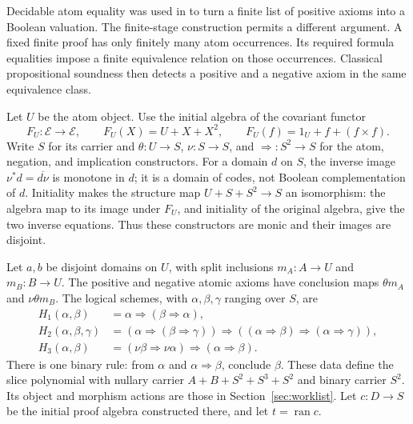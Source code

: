 \documentclass[11pt]{article}
\theoremstyle{definition}\newtheorem{definition}[theorem]{Definition}
\theoremstyle{remark}\newtheorem{remark}[theorem]{Remark}
\newcommand{\E}{\mathscr E}
\newcommand{\ran}{\operatorname{ran}}
\begin{document}
Decidable atom equality was used in \cite[Theorem~6.2]{FiniteProofs}
to turn a finite list of positive axioms into a Boolean valuation.
The finite-stage construction permits a different argument. A fixed
finite proof has only finitely many atom occurrences. Its required
formula equalities impose a finite equivalence relation on those
occurrences. Classical propositional soundness then detects a
positive and a negative axiom in the same equivalence class.

Let \(U\) be the atom object. Use the initial algebra of the covariant
functor
\[
 F_U:\E\to\E,\qquad F_U(X)=U+X+X^2,\qquad
 F_U(f)=1_U+f+(f\times f).
\]
Write \(S\) for its carrier and
\(\theta:U\to S\), \(\nu:S\to S\), and
\({\Rightarrow}:S^2\to S\) for the atom, negation, and implication
constructors. For a domain \(d\) on \(S\), the inverse image
\(\nu^*d=\overline{d\nu}\) is monotone in \(d\); it is a
domain of codes, not Boolean complementation of \(d\).
Initiality makes the structure map \(U+S+S^2\to S\)
an isomorphism: the algebra map to its image under \(F_U\), and
initiality of the original algebra, give the two inverse equations.
Thus these constructors are monic and their images are disjoint.

Let \(a,b\) be disjoint domains on \(U\), with split inclusions
\(m_A:A\to U\) and \(m_B:B\to U\). The positive and negative atomic
axioms have conclusion maps \(\theta m_A\) and \(\nu\theta m_B\).
The logical schemes, with \(\alpha,\beta,\gamma\) ranging over \(S\),
are
\begin{align*}
 H_1(\alpha,\beta)&=\alpha\Rightarrow(\beta\Rightarrow\alpha),\\
 H_2(\alpha,\beta,\gamma)&=
  (\alpha\Rightarrow(\beta\Rightarrow\gamma))
  \Rightarrow((\alpha\Rightarrow\beta)
                 \Rightarrow(\alpha\Rightarrow\gamma)),\\
 H_3(\alpha,\beta)&=
  (\nu\beta\Rightarrow\nu\alpha)
                 \Rightarrow(\alpha\Rightarrow\beta).
\end{align*}
There is one binary rule: from \(\alpha\) and
\(\alpha\Rightarrow\beta\), conclude \(\beta\).
These data define the slice polynomial with nullary carrier
\(A+B+S^2+S^3+S^2\) and binary carrier \(S^2\). Its object and
morphism actions are those in Section~\ref{sec:worklist}.
Let \(c:D\to S\) be the initial proof algebra constructed there,
and let \(t=\ran c\).
\end{document}
